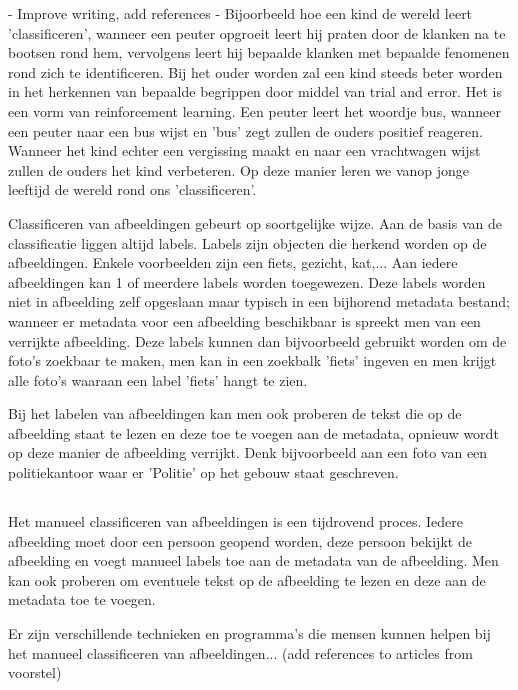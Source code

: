 - Improve writing, add references -
Bijoorbeeld hoe een kind de wereld leert 'classificeren', wanneer een peuter opgroeit leert hij praten door de klanken na te bootsen rond hem, vervolgens leert hij bepaalde klanken met bepaalde fenomenen rond zich te identificeren. Bij het ouder worden zal een kind steeds beter worden in het herkennen van bepaalde begrippen door middel van trial and error. Het is een vorm van reinforcement learning. Een peuter leert het woordje bus, wanneer een peuter naar een bus wijst en 'bus' zegt zullen de ouders positief reageren. Wanneer het kind echter een vergissing maakt en naar een vrachtwagen wijst zullen de ouders het kind verbeteren. Op deze manier leren we vanop jonge leeftijd de wereld rond ons 'classificeren'.

Classificeren van afbeeldingen gebeurt op soortgelijke wijze. Aan de basis van de classificatie liggen altijd labels. Labels zijn objecten die herkend worden op de afbeeldingen. Enkele voorbeelden zijn een fiets, gezicht, kat,... Aan iedere afbeeldingen kan 1 of meerdere labels worden toegewezen. Deze labels worden niet in afbeelding zelf opgeslaan maar typisch in een bijhorend metadata bestand; wanneer er metadata voor een afbeelding beschikbaar is spreekt men van een verrijkte afbeelding. Deze labels kunnen dan bijvoorbeeld gebruikt worden om de foto's zoekbaar te maken, men kan in een zoekbalk 'fiets' ingeven en men krijgt alle foto's waaraan een label 'fiets' hangt te zien.

Bij het labelen van afbeeldingen kan men ook proberen de tekst die op de afbeelding staat te lezen en deze toe te voegen aan de metadata, opnieuw wordt op deze manier de afbeelding verrijkt. Denk bijvoorbeeld aan een foto van een politiekantoor waar er 'Politie' op het gebouw staat geschreven.

\subsection{}
\label{sec:manuele-classificatie}
Het manueel classificeren van afbeeldingen is een tijdrovend proces. Iedere afbeelding moet door een persoon geopend worden, deze persoon bekijkt de afbeelding en voegt manueel labels toe aan de metadata van de afbeelding. Men kan ook proberen om eventuele tekst op de afbeelding te lezen en deze aan de metadata toe te voegen.

Er zijn verschillende technieken en programma's die mensen kunnen helpen bij het manueel classificeren van afbeeldingen... (add references to articles from voorstel)

